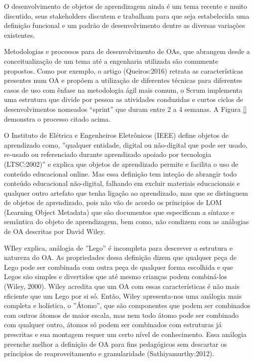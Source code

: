 \documentclass[12pt,openright,oneside,a4paper,english,french,spanish,brazil]{unifil}
\begin{document}
O desenvolvimento de objetos de aprendizagem ainda é um tema recente e muito discutido, seus stakeholders  discutem e trabalham para que seja estabelecida uma definição funcional e um padrão de desenvolvimento dentre  as diversas variações existentes. 
\par Metodologias e processos para de desenvolvimento de OAs, que abrangem desde a conceitualização de um tema até a engenharia utilizada são comumente propostos. Como por exemplo, o artigo (Queiros:2016) retrata as características presentes num OA e propõem a utilização de diferentes técnicas para diferentes casos de uso com ênfase na metodologia ágil mais comum, o Scrum implementa uma estrutura que divide por pessoa as atividades conduzidas e curtos ciclos de desenvolvimentos nomeados ``sprint'' que duram entre 2 a 4 semanas.
A Figura \ref{} demonstra o processo citado acima.

\par O Instituto de Elétrica e Engenheiros Eletrônicos (IEEE)  define objetos de aprendizado como, ''qualquer entidade, digital ou não-digital que pode ser usado, re-usado ou referenciado durante aprendizado apoiado por tecnologia (LTSC:2002)'' e explica que objetos de aprendizado permite e facilita o uso de conteúdo educacional online. Mas essa definição tem inteção de abrangir todo conteúdo educacional não-digital, falhando em excluir materiais educacionais e qualquer outro artefato que tenha ligação ao aprendizado, mas que se distinguem de objetos de aprendizado, pois não vão de acordo os príncipios de LOM (Learning Object Metadata) que são documentos que especificam a síntaxe e semântica do objeto de aprendizagem, bem como, não condizem com as análogias de OA descritas por David Wiley.
\par WIley explica, análogia de ''Lego'' é incompleta para descrever a estrutura e natureza do OA. As propriedades dessa definição dizem que qualquer peça de Lego pode ser combinada com outra peça de qualquer forma escolhida e que Legos são simples e divertidos que até mesmo crianças podem combiná-los (Wiley, 2000). Wiley acredita que um OA com essas características é não mais eficiente que um Lego por si só. Então, Wiley apresenta-nos uma análogia mais completa e holística, o ''Átomo'', que são componentes que podem ser combinados com outros átomos de maior escala, mas nem todo átomo pode ser combinado com qualquer outro, átomos só podem ser combinados com estruturas já prescritas e sua montagem requer um certo nível de conhecimento. Essa análogia preenche melhor a definição de OA para fins pedagógicos sem descartar os príncipios de reaproveitamento e granularidade (Sathiyamurthy:2012).
\end{document}
